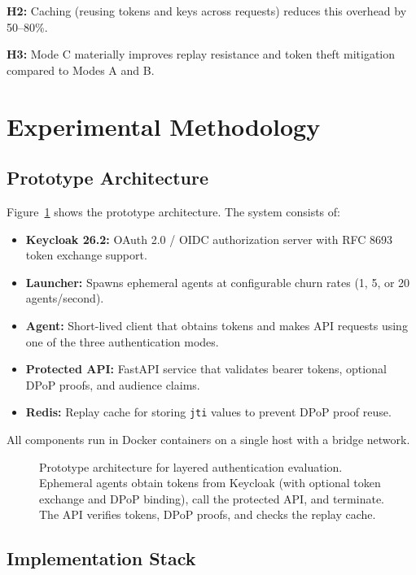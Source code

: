 \documentclass[conference,10pt]{IEEEtran}
\begin{document}
\textbf{H2:} Caching (reusing tokens and keys across requests) reduces this overhead by 50--80\%.

\textbf{H3:} Mode C materially improves replay resistance and token theft mitigation compared to Modes A and B.

\section{Experimental Methodology}

\subsection{Prototype Architecture}

Figure~\ref{fig:architecture} shows the prototype architecture. The system consists of:

\begin{itemize}
    \item \textbf{Keycloak 26.2:} OAuth 2.0 / OIDC authorization server with RFC 8693 token exchange support.
    \item \textbf{Launcher:} Spawns ephemeral agents at configurable churn rates (1, 5, or 20 agents/second).
    \item \textbf{Agent:} Short-lived client that obtains tokens and makes API requests using one of the three authentication modes.
    \item \textbf{Protected API:} FastAPI service that validates bearer tokens, optional DPoP proofs, and audience claims.
    \item \textbf{Redis:} Replay cache for storing \texttt{jti} values to prevent DPoP proof reuse.
\end{itemize}

All components run in Docker containers on a single host with a bridge network.

\begin{figure}[t]
\centering

\caption{Prototype architecture for layered authentication evaluation. Ephemeral agents obtain tokens from Keycloak (with optional token exchange and DPoP binding), call the protected API, and terminate. The API verifies tokens, DPoP proofs, and checks the replay cache.}
\label{fig:architecture}
\end{figure}

\subsection{Implementation Stack}
\end{document}
